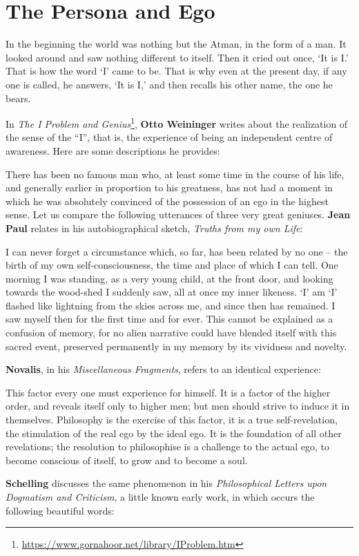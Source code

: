 \section{The Persona and Ego}

\begin{quotex}
In the beginning the world was nothing but the Atman, in the form of a man. It looked around and saw nothing different
to itself. Then it cried out once, ‘It is I.’ That is how the word `I’ came to be. That is why even at the present day, if any one is called, he answers, ‘It is I,’
and then recalls his other name, the one he bears. 

\end{quotex}
In \emph{The I Problem and Genius}\footnote{\url{https://www.gornahoor.net/library/IProblem.htm}}, \textbf{Otto Weininger} writes about the realization of the sense of the “I”, that
is, the experience of being an independent centre of awareness. Here are some descriptions he provides:

There has been no famous man who, at least some time in the course of his life, and generally earlier in proportion to
his greatness, has not had a moment in which he was absolutely convinced of the possession of an ego in the highest
sense. Let us compare the following utterances of three very great geniuses. \textbf{Jean Paul} relates in his
autobiographical sketch, \emph{Truths from my own Life}:

\begin{quotex}
I can never forget a circumstance which, so far, has been related by no one – the birth of my own self-consciousness,
the time and place of which I can tell. One morning I was standing, as a very young child, at the front door, and
looking towards the wood-shed I suddenly saw, all at once my inner likeness. `I’ am ‘I’ flashed like lightning from the skies across me, and since then has remained. I saw myself
then for the first time and for ever. This cannot be explained as a confusion of memory, for no alien narrative could
have blended itself with this sacred event, preserved permanently in my memory by its vividness and novelty. 

\end{quotex}
\textbf{Novalis}, in his \emph{Miscellaneous Fragments}, refers to an identical experience:

\begin{quotex}
This factor every one must experience for himself. It is a factor of the higher order, and reveals itself only to higher
men; but men should strive to induce it in themselves. Philosophy is the exercise of this factor, it is a true
self-revelation, the stimulation of the real ego by the ideal ego. It is the foundation of all other revelations; the
resolution to philosophise is a challenge to the actual ego, to become conscious of itself, to grow and to become a
soul. 

\end{quotex}
\textbf{Schelling} discusses the same phenomenon in his \emph{Philosophical Letters upon Dogmatism and Criticism}, a
little known early work, in which occurs the following beautiful words:

